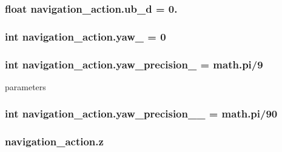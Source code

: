 \subsubsection[{\texorpdfstring{ub\+\_\+d}{ub_d}}]{\setlength{\rightskip}{0pt plus 5cm}float navigation\+\_\+action.\+ub\+\_\+d = 0.}\hypertarget{namespacenavigation__action_aad75661fd33d72b125133a1898175d4b}{}\label{namespacenavigation__action_aad75661fd33d72b125133a1898175d4b}
\subsubsection[{\texorpdfstring{yaw\+\_\+}{yaw_}}]{\setlength{\rightskip}{0pt plus 5cm}int navigation\+\_\+action.\+yaw\+\_\+ = 0}\hypertarget{namespacenavigation__action_aa356f2a5947d276649face9801529b11}{}\label{namespacenavigation__action_aa356f2a5947d276649face9801529b11}
\subsubsection[{\texorpdfstring{yaw\+\_\+precision\+\_\+}{yaw_precision_}}]{\setlength{\rightskip}{0pt plus 5cm}int navigation\+\_\+action.\+yaw\+\_\+precision\+\_\+ = math.\+pi/9}\hypertarget{namespacenavigation__action_a405244594bb4eea456e03e5b095d3869}{}\label{namespacenavigation__action_a405244594bb4eea456e03e5b095d3869}


parameters 

\subsubsection[{\texorpdfstring{yaw\+\_\+precision\+\_\+2\+\_\+}{yaw_precision_2_}}]{\setlength{\rightskip}{0pt plus 5cm}int navigation\+\_\+action.\+yaw\+\_\+precision\+\_\+\_\+ = math.\+pi/90}\hypertarget{namespacenavigation__action_a8ff0e6466c43c2a149fb09b9678d56bf}{}\label{namespacenavigation__action_a8ff0e6466c43c2a149fb09b9678d56bf}
\subsubsection[{\texorpdfstring{z}{z}}]{\setlength{\rightskip}{0pt plus 5cm}navigation\+\_\+action.\+z}\hypertarget{namespacenavigation__action_a5258daa88a84ac3fae37a796753c3a6f}{}\label{namespacenavigation__action_a5258daa88a84ac3fae37a796753c3a6f}
